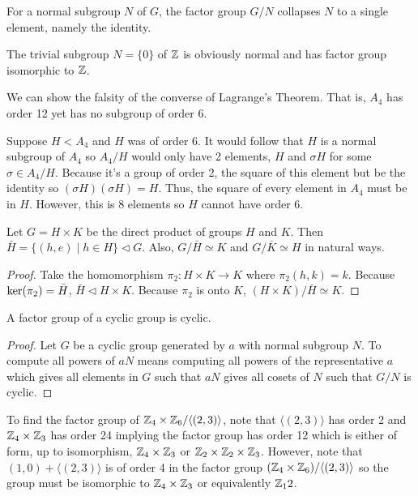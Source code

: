 \begin{remark}
    For a normal subgroup $N$ of $G$, the factor group $G/N$ collapses $N$ to a single element, namely the identity. 
\end{remark}
\begin{example}
    The trivial subgroup $N = \{0\}$ of $\mathbb{Z}$ is obviously normal and has factor group isomorphic to $\mathbb{Z}$.
\end{example}
\begin{example}
    We can show the falsity of the converse of Lagrange's Theorem. That is, $A_4$ has order 12 yet has no subgroup of order 6. 
    
    Suppose $H < A_4$ and $H$ was of order 6. It would follow that $H$ is a normal subgroup of $A_4$ so $A_4/H$ would only have 2 elements, $H$ and $\sigma H$ for some $\sigma \in A_4/H.$ Because it's a group of order 2, the square of this element but be the identity so $(\sigma H)(\sigma H) = H$. Thus, the square of every element in $A_4$ must be in $H$. However, this is 8 elements so $H$ cannot have order 6.
\end{example}
\begin{theorem}
    Let $G = H \times K$ be the direct product of groups $H$ and $K$. Then $\bar{H} = \{(h,e)\mid h \in H\} \vartriangleleft G$. Also, $G/\bar{H} \simeq K$ and $G / \bar{K} \simeq H$ in natural ways.
\end{theorem}
\begin{proof}
    Take the homomorphism $\pi_2\colon H\times K \to K$ where $\pi_2(h,k) = k.$ Because $\operatorname{ker}(\pi_2) = \bar{H}$, $\bar{H} \vartriangleleft H \times K.$ Because $\pi_2$ is onto $K$, $(H\times K)/\bar{H}\simeq K.$
\end{proof}
\begin{theorem}
    A factor group of a cyclic group is cyclic.
\end{theorem}
\begin{proof}
    Let $G$ be a cyclic group generated by $a$ with normal subgroup $N$. To compute all powers of $aN$ means computing all powers of the representative $a$ which gives all elements in $G$ such that $aN$ gives all cosets of $N$ such that $G/N$ is cyclic.
\end{proof}
\begin{example}
    To find the factor group of $\mathbb{Z}_4\times\mathbb{Z}_6/\langle(2,3)\rangle$, note that $\langle(2,3)\rangle$ has order 2 and $\mathbb{Z}_4\times\mathbb{Z}_3$ has order 24 implying the factor group has order 12 which is either of form, up to isomorphism, $\mathbb{Z}_4\times\mathbb{Z}_3$ or $\mathbb{Z}_2\times\mathbb{Z}_2\times\mathbb{Z}_3$. However, note that $(1,0) + \langle(2,3)\rangle$ is of order 4 in the factor group $(\mathbb{Z}_4\times\mathbb{Z}_6)/\langle(2,3)\rangle$ so the group must be isomorphic to $\mathbb{Z}_4\times\mathbb{Z}_3$ or equivalently $\mathbb{Z}_12$.
\end{example}
